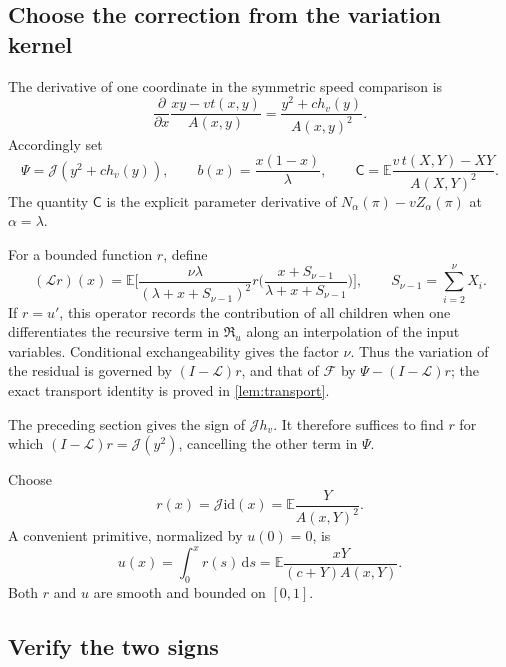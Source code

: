 \documentclass[11pt,a4paper]{article}
\numberwithin{equation}{section}
\theoremstyle{notethm}
\theoremstyle{definition}
\newcommand{\E}{\mathbb E}
\newcommand{\id}{\mathrm{id}}
\newcommand{\dd}{\,\mathrm d}
\newcommand{\cJ}{\mathcal J}
\newcommand{\cL}{\mathcal L}
\newcommand{\cF}{\mathscr F}
\newcommand{\res}{\mathfrak R}
\begin{document}
\subsection{Choose the correction from the variation kernel}

The derivative of one coordinate in the symmetric speed comparison is
\begin{equation}\label{eq:variation-kernel}
 \frac{\partial}{\partial x}
       \frac{xy-vt(x,y)}{A(x,y)}
 =\frac{y^2+c h_v(y)}{A(x,y)^2}.
\end{equation}
Accordingly set
\begin{equation}\label{eq:Psi}
 \Psi=\cJ(y^2+c h_v(y)),\qquad
 b(x)=\frac{x(1-x)}{\lambda},\qquad
 \mathsf C=\E\frac{v\,t(X,Y)-XY}{A(X,Y)^2}.
\end{equation}
The quantity $\mathsf C$ is the explicit parameter derivative of
$N_\alpha(\pi)-vZ_\alpha(\pi)$ at $\alpha=\lambda$.

For a bounded function $r$, define
\begin{equation}\label{eq:L}
 (\cL r)(x)=\E\biggl[
 \frac{\nu\lambda}{(\lambda+x+S_{\nu-1})^2}
 r\biggl(\frac{x+S_{\nu-1}}{\lambda+x+S_{\nu-1}}\biggr)
 \biggr],
 \qquad S_{\nu-1}=\sum_{i=2}^{\nu}X_i.
\end{equation}
If $r=u'$, this operator records the contribution of all children when
one differentiates the recursive term in $\res_u$ along an interpolation
of the input variables. Conditional exchangeability gives the factor
$\nu$. Thus the variation of the residual is governed by $(I-\cL)r$,
and that of $\cF$ by $\Psi-(I-\cL)r$; the exact transport identity is
proved in \cref{lem:transport}.

The preceding section gives the sign of $\cJ h_v$. It therefore suffices
to find $r$ for which $(I-\cL)r=\cJ(y^2)$, cancelling the other term in
$\Psi$.

Choose
\begin{equation}\label{eq:r-u}
 \boxed{\quad r(x)=\cJ\id(x)=\E\frac{Y}{A(x,Y)^2}.\quad}
\end{equation}
A convenient primitive, normalized by $u(0)=0$, is
\begin{equation}\label{eq:u-explicit}
 u(x)=\int_0^x r(s)\dd s
     =\E\frac{xY}{(c+Y)A(x,Y)}.
\end{equation}
Both $r$ and $u$ are smooth and bounded on $[0,1]$.

\subsection{Verify the two signs}
\end{document}
